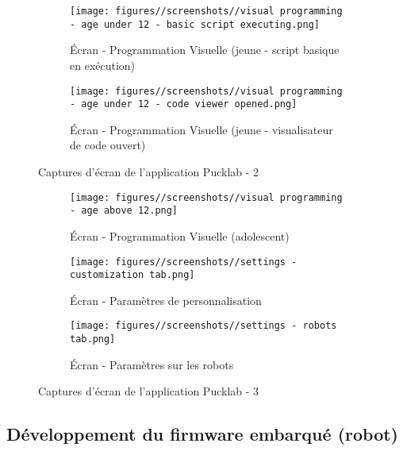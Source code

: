 \begin{figure}[H]
    \begin{subfigure}{0.45\linewidth}
        \centering
        \texttt{[image: figures//screenshots//visual programming - age under 12 - basic script executing.png]}
        \caption{\label{fig:vp_ageunder12_basicscriptexecuting} Écran - Programmation Visuelle (jeune - script basique en exécution)}
    \end{subfigure}
    \hfill
    \begin{subfigure}{0.45\linewidth}
        \centering
        \texttt{[image: figures//screenshots//visual programming - age under 12 - code viewer opened.png]}
        \caption{\label{fig:vp_ageunder12_codevieweropened} Écran - Programmation Visuelle (jeune - visualisateur de code ouvert)}
    \end{subfigure}

    \caption{\label{fig:screenshots-2} Captures d'écran de l'application Pucklab - 2}
\end{figure}

\begin{figure}[H]
    \centering

    \begin{subfigure}{0.45\linewidth}
        \centering
        \texttt{[image: figures//screenshots//visual programming - age above 12.png]}
        \caption{\label{fig:vp_ageabove12} Écran - Programmation Visuelle (adolescent)}
    \end{subfigure}
    \hfill
    \begin{subfigure}{0.45\linewidth}
        \centering
        \texttt{[image: figures//screenshots//settings - customization tab.png]}
        \caption{\label{fig:settings_customization} Écran - Paramètres de personnalisation}
    \end{subfigure}

    \vspace{0.25cm}

    \begin{subfigure}{0.45\linewidth}
        \centering
        \texttt{[image: figures//screenshots//settings - robots tab.png]}
        \caption{\label{fig:settings_robots} Écran - Paramètres sur les robots}
    \end{subfigure}

    \caption{\label{fig:screenshots-3} Captures d'écran de l'application Pucklab - 3}
\end{figure}

\subsection{Développement du firmware embarqué (robot)}

